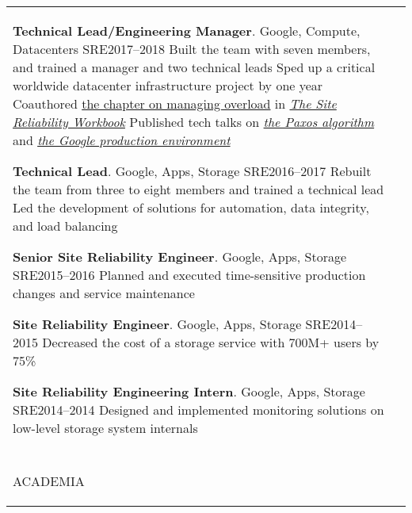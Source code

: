 \documentclass[letterpaper,10pt,oneside]{article}
\newcommand{\DatestampY}[1]{#1}
\newenvironment{body}
{\par\par
\begin{longtable}{p{0.125\textwidth}p{0.84\textwidth}}}
{\par\end{longtable}\par}
\renewcommand{\section}[3]{\\[-0.7cm]\pdfbookmark[2]{#2}{#3}\\%
\raggedleft  %
{\fontsize{9.5pt}{9.5pt}\selectfont\bfseries\raggedright%
\MakeUppercase{#1}}&}
\newcommand{\SmallEntryGap}{\par\vspace{0.38em}\par}
\begin{document}
\begin{body}
\textbf{Technical Lead/Engineering Manager}. Google, Compute, Datacenters SRE\hfill \DatestampY{2017}--\DatestampY{2018} \newline
\phantom{w}Built the team with seven members, and trained a manager and two technical leads\newline
\phantom{w}Sped up a critical worldwide datacenter infrastructure project by one year\newline
\phantom{w}Coauthored \href{https://landing.google.com/sre/workbook/chapters/overload/}{the chapter on managing overload} in \textit{\href{https://landing.google.com/sre/books/}{The Site Reliability Workbook}}\newline
\phantom{w}Published tech talks on \textit{\href{https://youtu.be/d7nAGI_NZPk}{the Paxos algorithm}} and \textit{\href{https://youtu.be/dhTVVWzpc4Q}{the Google production environment}}

\SmallEntryGap

\textbf{Technical Lead}. Google, Apps, Storage SRE\hfill \DatestampY{2016}--\DatestampY{2017}\newline
\phantom{w}Rebuilt the team from three to eight members and trained a technical lead\newline
\phantom{w}Led the development of solutions for automation, data integrity, and load balancing

\SmallEntryGap

\textbf{Senior Site Reliability Engineer}. Google, Apps, Storage SRE\hfill \DatestampY{2015}--\DatestampY{2016}\newline
\phantom{w}Planned and executed time-sensitive production changes and service maintenance

\SmallEntryGap

\textbf{Site Reliability Engineer}. Google, Apps, Storage SRE\hfill \DatestampY{2014}--\DatestampY{2015}\newline
\phantom{w}Decreased the cost of a storage service with 700M+ users by 75\%

\SmallEntryGap

\textbf{Site Reliability Engineering Intern}. Google, Apps, Storage SRE\hfill \DatestampY{2014}--\DatestampY{2014}\newline
\phantom{w}Designed and implemented monitoring solutions on low-level storage system internals


\section{Academia}{Academia}{PDF:Academia}


\end{body}
\end{document}
